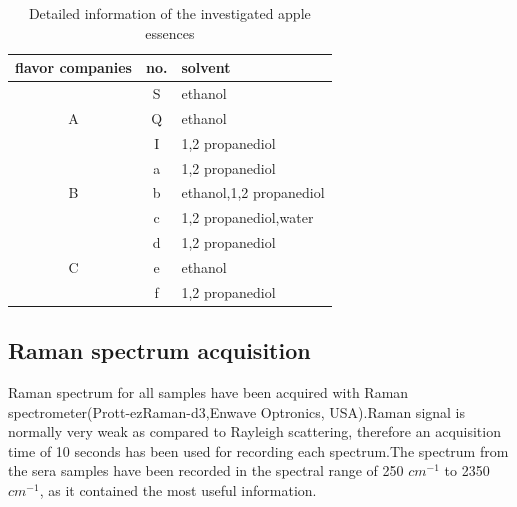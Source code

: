 \documentclass[a4paper]{article}
\begin{document}

\begin{table}[h] %
  \centering
  \caption{Detailed information of the investigated apple essences}\label{a}
  \begin{tabular}{c|c|l}

     \hline
     flavor companies       & no.       & solvent \\
     \hline
     \multirow{3}{*}{A}       & S         & ethanol \\
     \cline{2-3}
                              & Q         & ethanol \\
     \cline{2-3}
                              & I         & 1,2 propanediol \\
     \hline
     \multirow{3}{*}{B}       & a         & 1,2 propanediol \\
     \cline{2-3}
                              & b         & ethanol,1,2 propanediol \\
     \cline{2-3}
                              & c         & 1,2 propanediol,water \\
     \hline
     \multirow{3}{*}{C}       & d         & 1,2 propanediol \\
     \cline{2-3}
                              & e         & ethanol \\
     \cline{2-3}
                              & f         & 1,2 propanediol \\
     \hline
   \end{tabular}

\end{table}



\subsection{Raman spectrum acquisition}%
Raman spectrum for all samples have been acquired with Raman spectrometer(Prott-ezRaman-d3,Enwave Optronics, USA).Raman  signal  is  normally  very  weak  as  compared  to  Rayleigh  scattering,  therefore  an acquisition time of 10 seconds has been used for recording each spectrum.The spectrum from the  sera  samples  have  been  recorded  in  the  spectral  range  of  250 $cm^{−1}$  to  2350 $cm^{−1}$,  as  it contained the most useful information.
\end{document}
